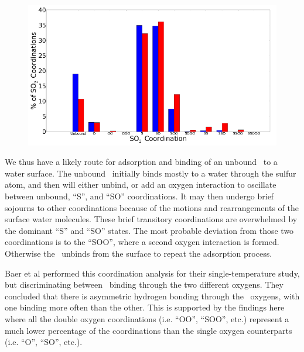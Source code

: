 \begin{figure}[h!]
	\begin{center}
		\includegraphics[scale=1.0]{images/coordinations/so2-coordinations-percents-small.png}
		\caption{}
		\label{fig:bonding-coordinations}
	\end{center}
\end{figure}

We thus have a likely route for adsorption and binding of an unbound \suldiox~to a water surface. The unbound \suldiox~initially binds mostly to a water through the sulfur atom, and then will either unbind, or add an oxygen interaction to oscillate between unbound, ``S'', and ``SO'' coordinations. It may then undergo brief sojourns to other coordinations because of the motions and rearrangements of the surface water molecules. These brief transitory coordinations are overwhelmed by the dominant ``S'' and ``SO'' states. The most probable deviation from those two coordinations is to the ``SOO'', where a second oxygen interaction is formed. Otherwise the \suldiox~unbinds from the surface to repeat the adsorption process.

Baer et al performed this coordination analysis for their single-temperature study, but discriminating between \suldiox~binding through the two different oxygens. They concluded that there is asymmetric hydrogen bonding through the \suldiox~oxygens, with one binding more often than the other. This is supported by the findings here where all the double oxygen coordinations (i.e. ``OO'', ``SOO'', etc.) represent a much lower percentage of the coordinations than the single oxygen counterparts (i.e. ``O'', ``SO'', etc.). 


